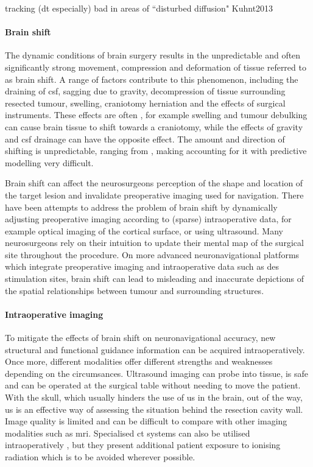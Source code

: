 tracking (dt especially) bad in areas of ``disturbed diffusion" Kuhnt2013

\paragraph*{Brain shift}

The dynamic conditions of brain surgery results in the unpredictable and often significantly strong movement, compression and deformation of tissue referred to as brain shift.
A range of factors contribute to this phenomenon, including the draining of \gls{csf}, sagging due to gravity, decompression of tissue surrounding resected tumour, swelling, craniotomy herniation  and the effects of surgical instruments.
These effects are often , for example swelling and tumour debulking can cause brain tissue to shift towards a craniotomy, while the effects of gravity and \gls{csf} drainage can have the opposite effect.
The amount and direction of shifting is unpredictable, ranging from , making accounting for it with predictive modelling very difficult.

Brain shift can affect the neurosurgeons perception of the shape and location of the target lesion  and invalidate preoperative imaging used for navigation.
There have been attempts to address the problem of brain shift by dynamically adjusting preoperative imaging according to (sparse) intraoperative data, for example optical imaging of the cortical surface, or using ultrasound. 
Many neurosurgeons rely on their intuition to update their mental map of the surgical site throughout the procedure.
On more advanced neuronavigational platforms which integrate preoperative imaging and intraoperative data such as \gls{des} stimulation sites, brain shift can lead to misleading and inaccurate depictions of the spatial relationships between tumour and surrounding structures.

\paragraph*{Intraoperative imaging}

To mitigate the effects of brain shift on neuronavigational accuracy, new structural and functional guidance information can be acquired intraoperatively.
Once more, different modalities offer different strengths and weaknesses depending on the circumsances.
Ultrasound imaging can probe into tissue, is safe  and can be operated at the surgical table without needing to move the patient.
With the skull, which usually hinders the use of \gls{us} in the brain, out of the way, \gls{us} is an effective way of assessing the situation behind the resection cavity wall.
Image quality is limited and can be difficult to compare with other imaging modalities such as \gls{mri}.
Specialised \gls{ct} systems can also be utilised intraoperatively \note{[examples]}, but they present additional patient exposure to ionising radiation which is to be avoided wherever possible.

